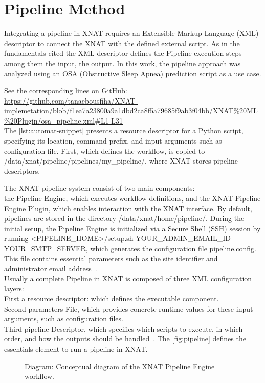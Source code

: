 
\section{Pipeline Method}

Integrating a pipeline in XNAT requires an Extensible Markup Language (XML) descriptor to connect the XNAT with the defined external script. As in the fundamentals cited the XML descriptor defines the Pipeline execution steps among them the input, the output. In this work, the pipeline approach was analyzed using an OSA (Obstructive Sleep Apnea) prediction script as a use case.
\normalsize



\noindent\footnotesize See the corresponding lines on GitHub:\url{ https://github.com/tanaebousfiha/XNAT-implemetation/blob/f1ea7a23800a9a1dbd2ca8f5a79685f9ab3f04bb/XNAT%20ML%20Plugin/osa_pipeline.xml#L1-L31}
\normalsize
\\
The \autoref{lst:automat-snippet} presents a resource descriptor for a Python script, specifying its location, command prefix, and input arguments such as configuration file. First, which defines the workflow, is copied to /data/xnat/pipeline/pipelines/my\_pipeline/, where XNAT stores pipeline descriptors. 

The XNAT pipeline system consist of two main components: \\
the Pipeline Engine, which executes workflow definitions, and the XNAT Pipeline Engine Plugin, which enables interaction with the XNAT interface.
By default, pipelines are stored in the directory /data/xnat/home/pipeline/. During the initial setup, the Pipeline Engine is initialized via a Secure Shell (SSH) session by running
<PIPELINE\_HOME>/setup.sh YOUR\_ADMIN\_EMAIL\_ID YOUR\_SMTP\_SERVER,
which generates the configuration file pipeline.config. This file contains essential parameters such as the site identifier and administrator email address~\cite{installpipeline}.\\
Usually a complete Pipeline in XNAT is composed of three XML configuration layers:\\
First a resource descriptor: which defines the executable component. \\
Second parameters File, which provides concrete runtime values for these input arguments, such as configuration files.\\
Third pipeline Descriptor, which  specifies which scripts to execute, in which order, and how the outputs should be handled~\cite{pipelinediscussion}. The \autoref{fig:pipeline} defines the essentials element to run a pipeline in XNAT. 
\begin{figure}[H]
    \centering
    \def\svgwidth{0.7\linewidth}
    
    \caption{ Diagram: Conceptual diagram of the XNAT Pipeline Engine workflow.}
    \label{fig:pipeline}
\end{figure}

